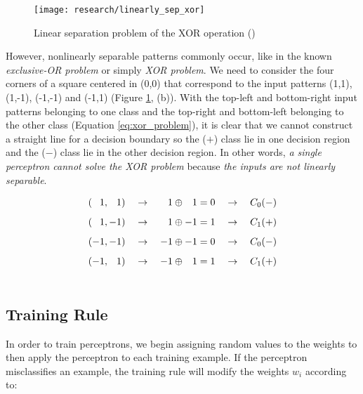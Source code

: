 	\begin{figure}[!ht]
		\centering
		\texttt{[image: research/linearly\_sep\_xor]}
		\caption{Linear separation problem of the XOR operation (\cite{mitchell1997})}
		\label{fig:linear_sep_xor}
	\end{figure}

	However, nonlinearly separable patterns commonly occur, like in the known \textit{exclusive-OR problem} or simply \textit{XOR problem}. We need to consider the four corners of a square centered in (0,0) that correspond to the input patterns (1,1), (1,-1), (-1,-1) and (-1,1) (Figure \ref{fig:linear_sep_xor}, (b)). With the top-left and bottom-right input patterns belonging to one class and the top-right and bottom-left belonging to the other class (Equation \ref{eq:xor_problem}), it is clear that we cannot construct a straight line for a decision boundary so the ($+$) class lie in one decision region and the ($-$) class lie in the other decision region. In other words, \textit{a single perceptron cannot solve the XOR problem} because \textit{the inputs are not linearly separable}.

	\begin{equation}
		\label{eq:xor_problem}
	    \begin{aligned}
	        (\hspace{0.78em} 1,\hspace{0.78em} 1) \quad \rightarrow \quad  \hspace{0.78em} 1 \oplus \hspace{0.78em} 1 = 0 \quad \rightarrow \quad C_0(-) \\[5pt]
	        (\hspace{0.78em} 1,-1) \quad \rightarrow \quad  \hspace{0.78em} 1 \oplus -1 = 1 \quad \rightarrow \quad C_1(+) \\[5pt]
	        (-1,-1) \quad \rightarrow \quad -1 \oplus -1 = 0 \quad \rightarrow \quad C_0(-) \\[5pt]
	        (-1, \hspace{0.78em} 1) \quad \rightarrow \quad -1 \oplus \hspace{0.78em} 1 = 1 \quad \rightarrow \quad C_1(+) \\[15pt]
	    \end{aligned}
	\end{equation}

	\subsection{Training Rule}
	In order to train perceptrons, we begin assigning random values to the weights to then apply the perceptron to each training example. If the perceptron misclassifies an example, the training rule will modify the weights $w_i$ according to:

